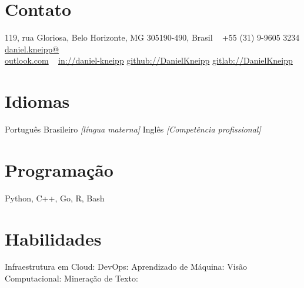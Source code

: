\documentclass[a4paper]{cv-friggeri-x}
\begin{document}


\begin{aside} %
\section{Contato}
\pin \hfill 119, rua Gloriosa,
Belo Horizonte, MG
305190-490, Brasil
~
{\Large\textcolor{gray}{\Mobilefone}} \hfill +55 (31) 9-9605 3234
{\Large\textcolor{gray}{\Letter}} \hfill \href{mailto:daniel.kneipp@outlook.com}{daniel.kneipp@\\outlook.com}
~
\llogo \hfill \href{https://www.linkedin.com/in/daniel-kneipp/}{in://daniel-kneipp}
\githublogo \hfill \href{https://github.com/DanielKneipp}{github://DanielKneipp}
\gitlablogo \hfill \href{https://gitlab.com/DanielKneipp}{gitlab://DanielKneipp}
\section{Idiomas}
Português Brasileiro \hspace{5mm}\null
\textit{\footnotesize{[língua materna]}}
Inglês  \hspace{5mm}\null
\textit{\footnotesize{[Competência profissional]}}
\section{Programação}
Python, C++, Go,
R, Bash
\section{Habilidades}
Infraestrutura \hspace{5mm}\null
em Cloud: \hspace{5mm}\null
{}
DevOps: \hspace{5mm}\null
{}
Aprendizado \hspace{5mm}\null
de Máquina: \hspace{5mm}\null
{}
Visão Computacional:  \hspace{5mm}\null
{}
Mineração de Texto:      \hspace{5mm}\null
{}
\end{aside}
\end{document}
